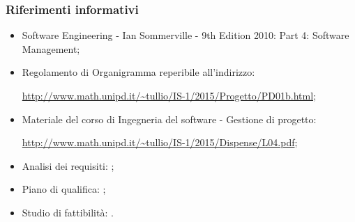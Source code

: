 \documentclass[../PianoProgetto.tex]{subfiles}
\begin{document}
		\subsubsection{Riferimenti informativi}
		\begin{itemize}
		\item Software Engineering - Ian Sommerville - 9th Edition 2010:  Part 4: Software Management;
		\item Regolamento di Organigramma reperibile all'indirizzo: \par
			\url{http://www.math.unipd.it/~tullio/IS-1/2015/Progetto/PD01b.html};
		\item Materiale del corso di Ingegneria del software - Gestione di progetto: \par
			\url{http://www.math.unipd.it/~tullio/IS-1/2015/Dispense/L04.pdf};
		\item Analisi dei requisiti: \analisideirequisitiv ;
		\item Piano di qualifica: \pianodiqualificav ;
		\item Studio di fattibilità: \studiodifattibilitav .
		\end{itemize}
			
\end{document}
